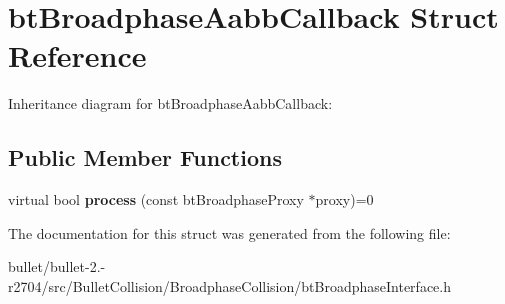 \hypertarget{structbt_broadphase_aabb_callback}{\section{bt\+Broadphase\+Aabb\+Callback Struct Reference}
\label{structbt_broadphase_aabb_callback}
}


Inheritance diagram for bt\+Broadphase\+Aabb\+Callback\+:
\subsection*{Public Member Functions}
\begin{DoxyCompactItemize}
\item 
\hypertarget{structbt_broadphase_aabb_callback_a8e04a31537f0becf52cdeb8120a15cc8}{virtual bool {\bfseries process} (const bt\+Broadphase\+Proxy $\ast$proxy)=0}\label{structbt_broadphase_aabb_callback_a8e04a31537f0becf52cdeb8120a15cc8}

\end{DoxyCompactItemize}


The documentation for this struct was generated from the following file\+:\begin{DoxyCompactItemize}
\item 
bullet/bullet-\/2.-\/r2704/src/\+Bullet\+Collision/\+Broadphase\+Collision/bt\+Broadphase\+Interface.\+h\end{DoxyCompactItemize}
